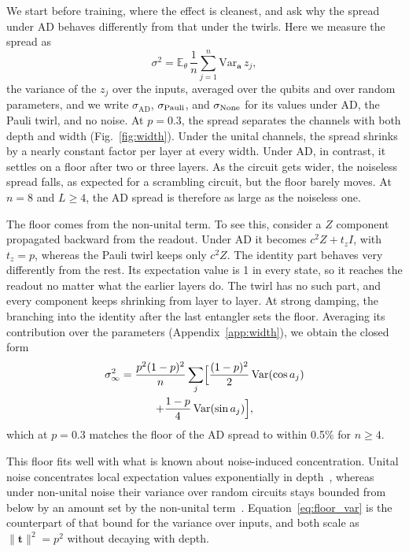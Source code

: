 \documentclass[
 aps,pra,
 twocolumn,
 superscriptaddress,
 longbibliography,
 nofootinbib
]{revtex4-2}
\newcommand{\AD}{\mathrm{AD}}
\begin{document}
We start before training, where the effect is cleanest, and ask why the
spread under AD behaves differently from that under the twirls. Here we
measure the spread as
\begin{equation}
\sigma^2=\mathbb E_\theta\,\frac1n\sum_{j=1}^n\mathrm{Var}_{\mathbf a}\,z_j ,
\label{eq:sigma_rms}
\end{equation}
the variance of the $z_j$ over the inputs, averaged over the qubits and over
random parameters, and we write $\sigma_{\AD}$, $\sigma_{\rm Pauli}$, and
$\sigma_{\rm None}$ for its values under AD, the Pauli twirl, and no noise. At
$p=0.3$, the spread separates the channels with both depth and width
(Fig.~\ref{fig:width}). Under the unital channels, the spread shrinks by a nearly constant factor
per layer at every width. Under AD, in contrast, it settles on a floor after
two or three layers. As the circuit gets wider,
the noiseless spread falls, as expected for a scrambling circuit, but the floor
barely moves. At $n=8$ and $L\ge4$, the AD spread is therefore as large as
the noiseless one.

The floor comes from the
non-unital term. To see this, consider a $Z$ component propagated backward
from the readout. Under AD it becomes $c^2Z+t_zI$, with $t_z=p$, whereas the
Pauli twirl keeps only $c^2Z$. The identity part behaves very differently from
the rest. Its expectation value is 1 in every state, so it reaches the readout
no matter what the earlier layers do. The twirl has no such part, and every
component keeps shrinking from layer to layer. At strong damping, the
branching into the identity after the last entangler sets the floor. Averaging
its contribution over the parameters (Appendix~\ref{app:width}), we obtain the
closed form
\begin{multline}
\sigma_\infty^2=\frac{p^2(1-p)^2}{n}\sum_j\Bigl[\frac{(1-p)^2}{2}\,
\mathrm{Var}(\cos a_j)\\
+\frac{1-p}{4}\,\mathrm{Var}(\sin a_j)\Bigr],
\label{eq:floor_var}
\end{multline}
which at $p=0.3$ matches the floor of the AD spread to within 0.5\% for $n\ge4$.

This floor fits well with what is known about noise-induced concentration.
Unital noise concentrates local expectation values exponentially in
depth~\cite{wang2021noiseinduced,schumann2024emergence}, whereas under
non-unital noise their variance over random circuits stays bounded from below
by an amount set by the non-unital term~\cite{mele2026noise}.
Equation~\eqref{eq:floor_var} is the counterpart of that bound for the
variance over inputs, and both scale as $\lVert\mathbf t\rVert^2=p^2$ without
decaying with depth.
\end{document}
